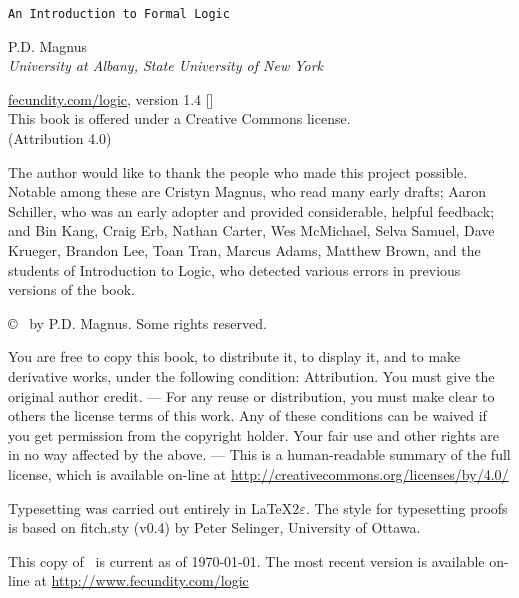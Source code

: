 \thispagestyle{empty}
{\Huge\forallx}

{\tt An Introduction to Formal Logic}

\vfill


{\sf P.D. Magnus}\\
\emph{University at Albany, State University of New York}


\vfill


{\sf
	\href{https://www.fecundity.com/logic/}{fecundity.com/logic}, version 1.4 [\bookversion]\\
	This book is offered under a Creative Commons license.\\
	(Attribution 4.0)
}



\newpage
\thispagestyle{empty}%
{\sf
The author would like to thank the people who made this project possible. Notable among these are Cristyn Magnus, who read many early drafts; Aaron Schiller, who was an early adopter and provided considerable, helpful feedback; {and} Bin Kang, Craig Erb, Nathan Carter, Wes McMichael, Selva Samuel,  Dave Krueger, Brandon Lee, Toan Tran, Marcus Adams, Matthew Brown, and the students of Introduction to Logic, who detected various errors in previous versions of the book.
}

\vfill
{
\copyright\  by P.D. Magnus. Some rights reserved.
}

{\footnotesize
You are free to copy this book, to distribute it, to display it, and to make derivative works, under the following condition: Attribution. You must give the original author credit. --- For any reuse or distribution, you must make clear to others the license terms of this work. Any of these conditions can be waived if you get permission from the copyright holder. Your fair use and other rights are in no way affected by the above. --- This is a human-readable summary of the full license, which is available on-line at \url{http://creativecommons.org/licenses/by/4.0/}
}

{
Typesetting was carried out entirely in \LaTeX$2\varepsilon$. The style for typesetting proofs is based on fitch.sty (v0.4) by Peter Selinger, University of Ottawa.

This copy of \forallx\ is current as of \today. The most recent version is available on-line at \url{http://www.fecundity.com/logic}
}


